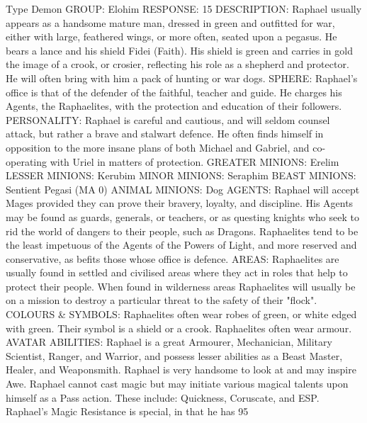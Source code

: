 \begin{Description}

\item[Type] Demon
GROUP: Elohim
RESPONSE: 15%
DESCRIPTION: Raphael usually appears as a handsome mature man, dressed in green and outfitted for war, either with large, feathered wings, or more often, seated upon a pegasus. He bears a lance and his shield Fidei (Faith).  His shield is green and carries in gold the image of a crook, or crosier, reflecting his role as a shepherd and protector. He will often bring with him a pack of hunting or war dogs.
SPHERE: Raphael's office is that of the defender of the faithful, teacher and guide.  He charges his Agents, the Raphaelites, with the protection and education of their followers.
PERSONALITY: Raphael is careful and cautious, and will seldom counsel attack, but rather a brave and stalwart defence. He often finds himself in opposition to the more insane plans of both Michael and Gabriel, and co-operating with Uriel in matters of protection.
GREATER MINIONS: Erelim 
LESSER MINIONS: Kerubim 
MINOR MINIONS: Seraphim 
BEAST MINIONS: Sentient Pegasi (MA 0)
ANIMAL MINIONS: Dog
AGENTS: Raphael will accept Mages provided they can prove their bravery, loyalty, and discipline. His Agents may be found as guards, generals, or teachers, or as questing knights who seek to rid the world of dangers to their people, such as Dragons. Raphaelites tend to be the least impetuous of the Agents of the Powers of Light, and more reserved and conservative, as befits those whose office is defence.
AREAS: Raphaelites are usually found in settled and civilised areas where they act in roles that help to protect their people. When found in wilderness areas Raphaelites will usually be on a mission to destroy a particular threat to the safety of their "flock".
COLOURS \& SYMBOLS: Raphaelites often wear robes of green, or white edged with green. Their symbol is a shield or a crook. Raphaelites often wear armour.
AVATAR ABILITIES: Raphael is a great Armourer, Mechanician, Military Scientist, Ranger, and Warrior, and possess lesser abilities as a Beast Master, Healer, and Weaponsmith. Raphael is very handsome to look at and may inspire Awe. Raphael cannot cast magic but may initiate various magical talents upon himself as a Pass action. These include: Quickness, Coruscate, and ESP. Raphael's Magic Resistance is special, in that he has 95%


\end{Description}
